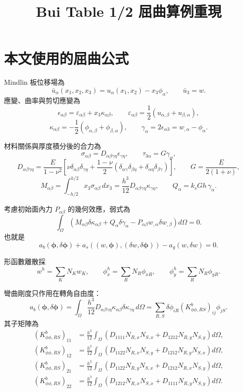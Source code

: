 \documentclass[12pt,a4paper]{article}
\title{Bui Table 1/2 屈曲算例重現}
\author{}
\date{}
\begin{document}
\maketitle

\section{本文使用的屈曲公式}
Mindlin 板位移場為
\[
\bar{u}_{\alpha}(x_1,x_2,x_3)
=u_{\alpha}(x_1,x_2)-x_3\phi_{\alpha},
\qquad
\bar{u}_3=w .
\]
應變、曲率與剪切應變為
\[
\epsilon_{\alpha\beta}
=\varepsilon_{\alpha\beta}+x_3\kappa_{\alpha\beta},
\qquad
\varepsilon_{\alpha\beta}
=\frac{1}{2}(u_{\alpha,\beta}+u_{\beta,\alpha}),
\]
\[
\kappa_{\alpha\beta}
=-\frac{1}{2}(\phi_{\alpha,\beta}+\phi_{\beta,\alpha}),
\qquad
\gamma_\alpha=2\epsilon_{\alpha3}=w_{,\alpha}-\phi_\alpha .
\]

材料關係與厚度積分後的合力為
\[
\sigma_{\alpha\beta}
=D_{\alpha\beta\gamma\eta}\epsilon_{\gamma\eta},
\qquad
\tau_{3\alpha}=G\gamma_\alpha ,
\]
\[
D_{\alpha\beta\gamma\eta}
=\frac{E}{1-\nu^2}\left[
\nu\delta_{\alpha\beta}\delta_{\gamma\eta}
+\frac{1-\nu}{2}
(\delta_{\alpha\gamma}\delta_{\beta\eta}
+\delta_{\alpha\eta}\delta_{\beta\gamma})
\right],
\qquad
G=\frac{E}{2(1+\nu)},
\]
\[
M_{\alpha\beta}
=\int_{-h/2}^{h/2}x_3\sigma_{\alpha\beta}\,dx_3
=\frac{h^3}{12}D_{\alpha\beta\gamma\eta}\kappa_{\gamma\eta},
\qquad
Q_\alpha=k_sGh\,\gamma_\alpha .
\]

考慮初始面內力 \(P_{\alpha\beta}\) 的幾何效應，弱式為
\[
\int_{\Omega}
\left(
M_{\alpha\beta}\delta\kappa_{\alpha\beta}
+Q_\alpha\delta\gamma_\alpha
-P_{\alpha\beta}w_{,\alpha}\delta w_{,\beta}
\right)d\Omega=0 .
\]
也就是
\[
a_b(\boldsymbol\phi,\delta\boldsymbol\phi)
+a_s((w,\boldsymbol\phi),(\delta w,\delta\boldsymbol\phi))
-a_g(w,\delta w)=0 .
\]

形函數離散採
\[
w^h=\sum_KN_Kw_K,\qquad
\phi_x^h=\sum_RN_R\phi_{xR},\qquad
\phi_y^h=\sum_RN_R\phi_{yR}.
\]


彎曲剛度只作用在轉角自由度：
\[
a_b(\boldsymbol\phi,\delta\boldsymbol\phi)
=\int_{\Omega}\frac{h^3}{12}
D_{\alpha\beta\gamma\eta}
\kappa_{\alpha\beta}\delta\kappa_{\gamma\eta}\,d\Omega
=\sum_{R,S}\delta\phi_{iR}
\left(K_{\phi\phi,RS}^b\right)_{ij}\phi_{jS}.
\]
其子矩陣為
\[
\begin{aligned}
\left(K_{\phi\phi,RS}^b\right)_{11}
&=\frac{h^3}{12}\int_{\Omega}
\left(D_{1111}N_{R,x}N_{S,x}
+D_{1212}N_{R,y}N_{S,y}\right)d\Omega,\\
\left(K_{\phi\phi,RS}^b\right)_{12}
&=\frac{h^3}{12}\int_{\Omega}
\left(D_{1122}N_{R,x}N_{S,y}
+D_{1212}N_{R,y}N_{S,x}\right)d\Omega,\\
\left(K_{\phi\phi,RS}^b\right)_{21}
&=\frac{h^3}{12}\int_{\Omega}
\left(D_{1122}N_{R,y}N_{S,x}
+D_{1212}N_{R,x}N_{S,y}\right)d\Omega,\\
\left(K_{\phi\phi,RS}^b\right)_{22}
&=\frac{h^3}{12}\int_{\Omega}
\left(D_{1212}N_{R,x}N_{S,x}
+D_{1111}N_{R,y}N_{S,y}\right)d\Omega .
\end{aligned}
\]
\end{document}

